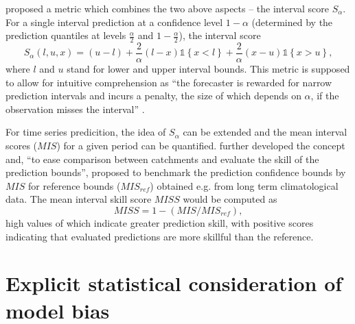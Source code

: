\documentclass{ctuthesis}\usepackage[]{graphicx}\usepackage[]{color}
\begin{document}
\cite{gneiting2007strictly} proposed a metric which combines the two above aspects  -- the interval score $S_\alpha$. For a single interval prediction at a confidence level $1-\alpha$ (determined by the prediction quantiles at levels $ \frac{\alpha}{2} $ and $ 1-\frac{\alpha}{2} $), the interval score 
\begin{equation}
S_\alpha(l,u,x) =  ( u - l ) + \frac{2}{\alpha} (l - x)  \mathds{1} \left\{x < l \right\} + \frac{2}{\alpha} (x - u)  \mathds{1} \left\{x > u \right\} ,
\end{equation}
where $l$ and $u$ stand for lower and upper interval bounds. This metric is supposed to allow for intuitive comprehension as \enquote{the forecaster is rewarded for narrow prediction intervals and incurs a penalty, the size of which depends on $\alpha$, if the observation misses the interval} \citep{gneiting2007strictly}.

For time series predicition, the idea of $S_\alpha$ can be extended and the mean interval scores ($M\!I\!S$) for a given period can be quantified. \cite{bourginTransferringGlobalUncertainty2015} further developed the concept and, \enquote{to ease comparison between catchments and evaluate the skill of the prediction bounds}, proposed to benchmark the prediction confidence bounds by $M\!I\!S$ for reference bounds ($M\!I\!S_{ref}$) obtained e.g. from long term climatological data. The mean interval skill score $M\!I\!S\!S$ would be computed as 
\begin{equation}
M\!I\!S\!S = 1 -  ( M\!I\!S  /  M\!I\!S_{ref} ),  
\end{equation}
high values of which indicate greater prediction skill, with positive scores indicating that evaluated predictions are more skillful than the reference.

\section{Explicit statistical consideration of model bias} \label{delGiudTheor}
\end{document}
